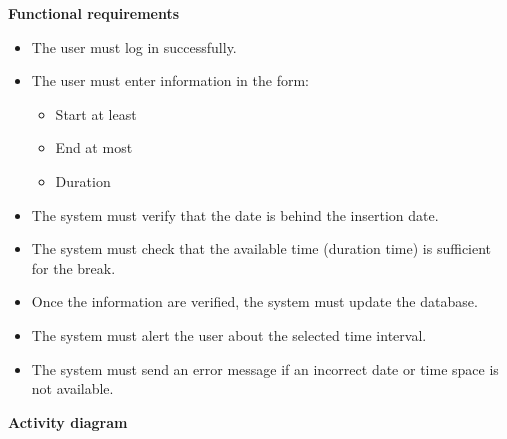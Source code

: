 \documentclass{article}
\begin{document}
	\bigskip
	\noindent
	\textbf{Functional requirements} \\
	\begin{itemize}
		\item The user must log in successfully.
		\item The user must enter information in the form:
			\begin{itemize}
				\item Start at least
				\item End at most
				\item Duration
			\end{itemize}
		\item The system must verify that the date is behind the insertion date.
		\item The system must check that the available time (duration time) is sufficient for the break.
		\item Once the information are verified, the system must update the database.
		\item The system must alert the user about the selected time interval.
		\item The system must send an error message if an incorrect date or time space is not available.
	\end{itemize}
	
	\newpage
	\noindent
	\textbf{Activity diagram} \\
	
\end{document}
